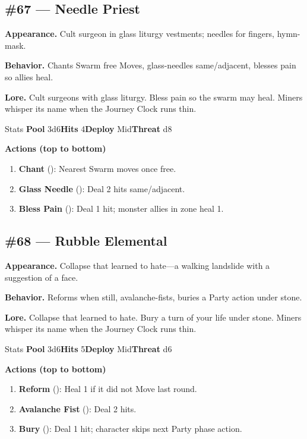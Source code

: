 \subsection*{\#67 --- Needle Priest}

\textbf{Appearance.} Cult surgeon in glass liturgy vestments; needles for fingers, hymn-mask.

\textbf{Behavior.} Chants Swarm free Moves, glass-needles same/adjacent, blesses pain so allies heal.

\textbf{Lore.} Cult surgeons with glass liturgy. Bless pain so the swarm may heal. Miners whisper its name when the Journey Clock runs thin.

\begin{monsterentry}{Stats}
\textbf{Pool} 3d6\quad\textbf{Hits} 4\quad\textbf{Deploy} Mid\quad\textbf{Threat} d8

\textbf{Actions (top to bottom)}
\begin{enumerate}\setlength{\itemsep}{0.15em}\setlength{\parskip}{0pt}
  \item \textbf{Chant} (\easy): Nearest Swarm moves once free.
  \item \textbf{Glass Needle} (\medium): Deal 2 hits same/adjacent.
  \item \textbf{Bless Pain} (\hard): Deal 1 hit; monster allies in zone heal 1.
\end{enumerate}
\end{monsterentry}

\subsection*{\#68 --- Rubble Elemental}

\textbf{Appearance.} Collapse that learned to hate---a walking landslide with a suggestion of a face.

\textbf{Behavior.} Reforms when still, avalanche-fists, buries a Party action under stone.

\textbf{Lore.} Collapse that learned to hate. Bury a turn of your life under stone. Miners whisper its name when the Journey Clock runs thin.

\begin{monsterentry}{Stats}
\textbf{Pool} 3d6\quad\textbf{Hits} 5\quad\textbf{Deploy} Mid\quad\textbf{Threat} d6

\textbf{Actions (top to bottom)}
\begin{enumerate}\setlength{\itemsep}{0.15em}\setlength{\parskip}{0pt}
  \item \textbf{Reform} (\easy): Heal 1 if it did not Move last round.
  \item \textbf{Avalanche Fist} (\medium): Deal 2 hits.
  \item \textbf{Bury} (\hard): Deal 1 hit; character skips next Party phase action.
\end{enumerate}
\end{monsterentry}

